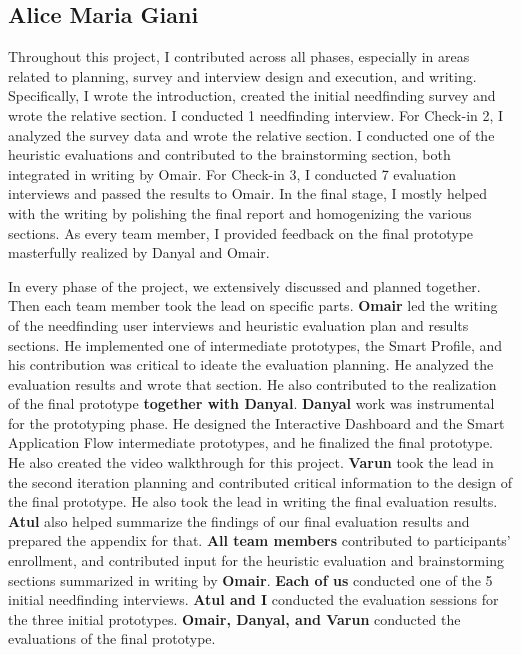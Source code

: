 \documentclass[
	letterpaper, %
]{jdf}
\begin{document}
\begin{sloppypar}
\newpage

\subsection{Alice Maria Giani}

Throughout this project, I contributed across all phases, especially in areas related to planning, survey and interview design and execution, and writing. Specifically, I wrote the introduction, created the initial needfinding survey and wrote the relative section. I conducted 1 needfinding interview. For Check-in 2, I analyzed the survey data and wrote the relative section. I conducted one of the heuristic evaluations and contributed to the brainstorming section, both integrated in writing by Omair. For Check-in 3, I conducted 7 evaluation interviews and passed the results to Omair. In the final stage, I mostly helped with the writing by polishing the final report and homogenizing the various sections. As every team member, I provided feedback on the final prototype masterfully realized by Danyal and Omair.

In every phase of the project, we extensively discussed and planned together. Then each team member took the lead on specific parts. \textbf{Omair} led the writing of the needfinding user interviews and heuristic evaluation plan and results sections. He implemented one of intermediate prototypes, the Smart Profile, and his contribution was critical to ideate the evaluation planning. He analyzed the evaluation results and wrote that section. He also contributed to the realization of the final prototype \textbf{together with Danyal}. \textbf{Danyal} work was instrumental for the prototyping phase. He designed the Interactive Dashboard and the Smart Application Flow intermediate prototypes, and he finalized the final prototype. He also created the video walkthrough for this project. \textbf{Varun} took the lead in the second iteration planning and contributed critical information to the design of the final prototype. He also took the lead in writing the final evaluation results. \textbf{Atul} also helped summarize the findings of our final evaluation results and prepared the appendix for that.  \textbf{All team members} contributed to participants' enrollment, and contributed input for the heuristic evaluation and brainstorming sections summarized in writing by \textbf{Omair}. \textbf{Each of us} conducted one of the 5 initial needfinding interviews. \textbf{Atul and I} conducted the evaluation sessions for the three initial prototypes. \textbf{Omair, Danyal, and Varun} conducted the evaluations of the final prototype. 


\end{sloppypar}
\end{document}
